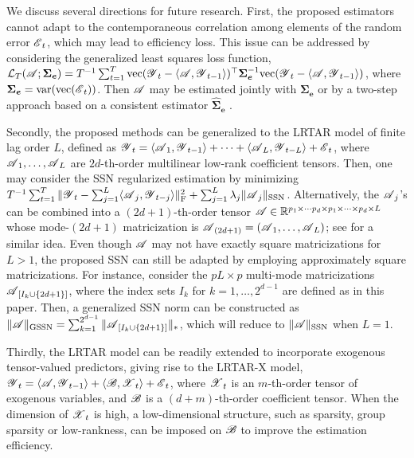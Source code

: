 \documentclass[12pt]{article}
\newcommand{\bm}{\boldsymbol}
\newcommand{\cm}[1]{\mbox{\boldmath$\mathscr{#1}$}}
\begin{document}
We discuss several directions for future research. First,  the proposed estimators cannot adapt to the contemporaneous correlation among elements of the random error $\cm{E}_t$, which may lead to efficiency loss. This issue can be addressed by considering the generalized least squares loss function, $\mathcal{L}_T(\cm{A};\bm{\Sigma}_{\bm{e}} )=T^{-1}\sum_{t=1}^{T}\text{vec}(\cm{Y}_t-\langle\cm{A},\cm{Y}_{t-1}\rangle)^\top\bm{\Sigma}^{-1}_{\bm{e}}\text{vec}(\cm{Y}_t-\langle\cm{A},\cm{Y}_{t-1}\rangle)$, where $\bm{\Sigma}_{\bm{e}}=\text{var}(\text{vec}(\cm{E}_t))$. Then $\cm{A}$ may be estimated jointly with $\bm{\Sigma}_{\bm{e}}$ or by a two-step approach based on a consistent estimator $\bm{\widehat{\Sigma}}_{\bm{e}}$ \citep{basu2015regularized, Davis2016}.

Secondly, the proposed methods can be generalized to the LRTAR model of finite lag order $L$, defined as
	$\cm{Y}_t=\langle\cm{A}_1,\cm{Y}_{t-1}\rangle+\cdots+\langle\cm{A}_L,\cm{Y}_{t-L}\rangle+\cm{E}_t$,
where $\cm{A}_1, \dots, \cm{A}_L$ are $2d$-th-order multilinear low-rank coefficient tensors. Then, one may consider the SSN regularized estimation by minimizing
	$ T^{-1}\sum_{t=1}^T\|\cm{Y}_t-\sum_{j=1}^L\langle\cm{A}_j,\cm{Y}_{t-j}\rangle\|_{\text{F}}^2+\sum_{j=1}^L\lambda_j\|\cm{A}_j\|_{\text{SSN}}$.
Alternatively, the  $\cm{A}_j$'s can be combined into a $(2d+1)$-th-order tensor $\cm{A}\in\mathbb{R}^{p_1\times\cdots p_d\times p_1\times\cdots\times p_d\times L}$ whose mode-$(2d+1)$ matricization is $\cm{A}_{(2d+1)}=(\cm{A}_1,\dots,\cm{A}_L)$; see \cite{wang2019high} for a similar idea.  Even though $\cm{A}$ may not have exactly square matricizations for $L>1$,  the proposed SSN can still be adapted by employing approximately square matricizations. For instance, consider the $pL\times p$ multi-mode matricizations $\cm{A}_{[I_k\cup\{2d+1\}]}$, where the index sets $I_k$ for $k=1,\dots,2^{d-1}$ are defined as in this paper. Then, a generalized SSN norm can be constructed as $\|\cm{A}\|_{\text{GSSN}}=\sum_{k=1}^{2^{d-1}}\|\cm{A}_{[I_k\cup\{2d+1\}]}\|_*$, which will reduce to $\|\cm{A}\|_{\text{SSN}}$ when $L=1$.

Thirdly, the LRTAR model can be readily extended to incorporate exogenous tensor-valued predictors, giving rise to the LRTAR-X model, 
	$\cm{Y}_t=\langle\cm{A},\cm{Y}_{t-1}\rangle+\langle\cm{B},\cm{X}_{t}\rangle+\cm{E}_t$,
where $\cm{X}_{t}$ is an $m$-th-order tensor of exogenous variables, and $\cm{B}$ is a $(d+m)$-th-order coefficient tensor. When the dimension of $\cm{X}_t$ is high, a low-dimensional structure, such as sparsity, group sparsity or low-rankness, can be imposed on $\cm{B}$ to improve the estimation efficiency.
\end{document}
